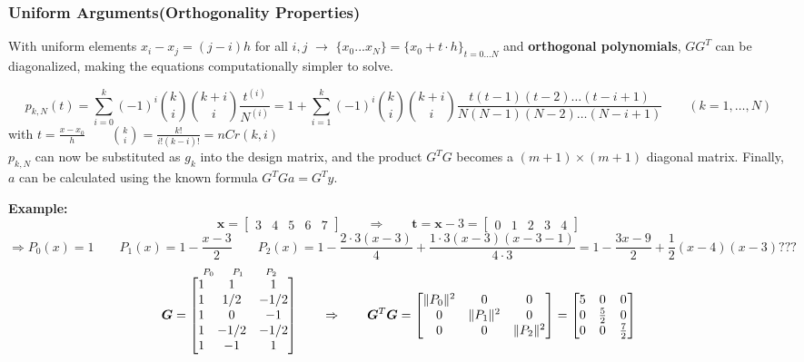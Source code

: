 \subsubsection{Uniform Arguments\quad (Orthogonality Properties)} \label{sssec:ls_orthogonal}
With uniform elements $x_i - x_j = (j-i) h$ for all $i, j$ $\rightarrow$ $\{x_0...x_N\} = \{x_0 + t \cdot h\}_{t=0...N}$ and \textbf{orthogonal polynomials},
$G G^T$ can be diagonalized, making the equations computationally simpler to solve.

$$\boxed{p_{k,N}(t) = \sum_{i=0}^k (-1)^i \binom{k}{i} \binom{k+i}{i} \frac{t^{(i)}}{N^{(i)}}=
1+\sum_{i=1}^k (-1)^i \binom{k}{i} \binom{k+i}{i} \frac{t(t-1)(t-2)\ldots(t-i+1)}{N(N-1)(N-2)\ldots(N-i+1)} \qquad (k = 1,\ldots,N)}$$
with $t=\frac{x-x_0}{h} \qquad \binom{k}{i}=\frac{k!}{i!(k-i)!}=nCr(k,i)$\\
$p_{k,N}$ can now be substituted as $g_{k}$ into the design matrix, and the product $G^T G$ becomes
a $(m+1)\times(m+1)$ diagonal matrix. Finally, $a$ can be calculated using the known formula
$G^T G a = G^T y$.

\textbf{Example:}
$$\bm{x}=
	   \begin{bmatrix}
			3&4&5&6&7
	   \end{bmatrix}\qquad \Rightarrow\qquad \bm{t}=\bm{x}-3=
	   \begin{bmatrix}
	   		0&1&2&3&4
	   \end{bmatrix}$$
$$\Rightarrow P_0(x)=1 \qquad P_1(x)= 1-\frac{x-3}{2}\qquad P_2(x)=1-\frac{2\cdot 3 (x-3)}{4}+\frac{1 \cdot 3 (x-3)(x-3 -1)}{4 \cdot 3} = 1-\frac{3x-9}{2}+\frac 12 (x-4)(x-3)???$$
$$\overset{\hspace{0.6cm} P_0 \hspace{0.5cm} P_1 \hspace{0.6cm} P_2}{\bm{G} = \begin{bmatrix}
  1 & 1 	& 1\\
  1 & 1/2 	& -1/2\\
  1 & 0	  	& -1\\
  1 & -1/2 	& -1/2\\
  1 & -1 	& 1\\
\end{bmatrix}}\qquad \Rightarrow\qquad
\bm{G}^T\bm{G}=\begin{bmatrix}
 \| P_0\|^2 	& 0 	& 0\\
  0 		& \|P_1\|^2 	& 0\\
  0 		& 0	  	&\|P_2\|^2\\
\end{bmatrix}
= \begin{bmatrix}
  5 & 0 & 0 \\
  0 & \frac52 & 0\\
  0 & 0 & \frac{7} {2}\\
\end{bmatrix}
$$

